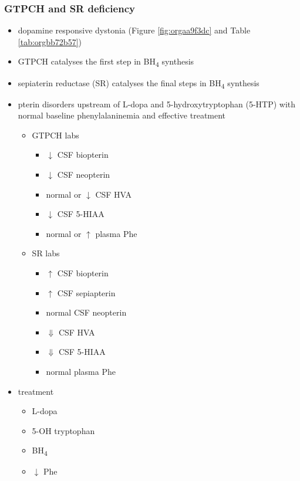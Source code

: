 \documentclass[12pt]{scrartcl}
\begin{document}
\subsubsection{GTPCH and SR deficiency}
\label{sec:orgd2e35aa}
\begin{itemize}
\item dopamine responsive dystonia (Figure \ref{fig:orgaa9f3dc} and Table \ref{tab:orgbb72b57})
\item GTPCH catalyses the first step in BH\textsubscript{4} synthesis
\item sepiaterin reductase (SR) catalyses the final steps in BH\textsubscript{4} synthesis
\item pterin disorders upstream of L-dopa and 5-hydroxytryptophan
(5-HTP) with normal baseline phenylalaninemia and effective
treatment
\begin{itemize}
\item GTPCH labs
\begin{itemize}
\item \(\downarrow\) CSF biopterin
\item \(\downarrow\) CSF neopterin
\item normal or \(\downarrow\) CSF HVA
\item \(\downarrow\) CSF 5-HIAA
\item normal or \(\uparrow\) plasma Phe
\end{itemize}
\item SR labs
\begin{itemize}
\item \(\uparrow\) CSF biopterin
\item \(\uparrow\) CSF sepiapterin
\item normal CSF neopterin
\item \(\Downarrow\) CSF HVA
\item \(\Downarrow\) CSF 5-HIAA
\item normal plasma Phe
\end{itemize}
\end{itemize}
\item treatment
\begin{itemize}
\item L-dopa
\item 5-OH tryptophan
\item BH\textsubscript{4}
\item \(\downarrow\) Phe
\end{itemize}
\end{itemize}
\end{document}
